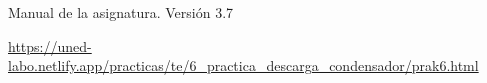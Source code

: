 \documentclass{article}
\begin{document}
\begin{multicols}{2}
\begin{thebibliography}{1}
  Manual de la asignatura. Versión 3.7

  \url{https://uned-labo.netlify.app/practicas/te/6_practica_descarga_condensador/prak6.html}

\end{thebibliography}
\end{multicols}
\end{document}
